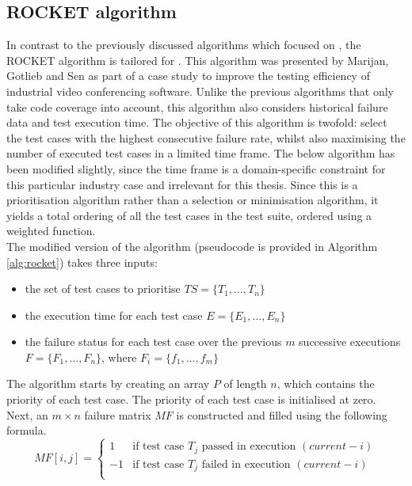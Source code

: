
\subsection{ROCKET algorithm}
\label{ssec:alg-rocket}
In contrast to the previously discussed algorithms which focused on \tsm{}, the ROCKET algorithm is tailored for \tcp{}. This algorithm was presented by Marijan, Gotlieb and Sen \cite{6676952} as part of a case study to improve the testing efficiency of industrial video conferencing software. Unlike the previous algorithms that only take code coverage into account, this algorithm also considers historical failure data and test execution time. The objective of this algorithm is twofold: select the test cases with the highest consecutive failure rate, whilst also maximising the number of executed test cases in a limited time frame. The below algorithm has been modified slightly, since the time frame is a domain-specific constraint for this particular industry case and irrelevant for this thesis. Since this is a prioritisation algorithm rather than a selection or minimisation algorithm, it yields a total ordering of all the test cases in the test suite, ordered using a weighted function.\\

\noindent The modified version of the algorithm (pseudocode is provided in Algorithm \autoref{alg:rocket}) takes three inputs:
\begin{itemize}
	\item the set of test cases to prioritise $TS = \{T_1, \dots, T_n\}$
	\item the execution time for each test case $E = \{E_1, \dots, E_n\}$
	\item the failure status for each test case over the previous $m$ successive executions $F = \{F_1, \dots, F_n\}$, where $F_i = \{f_1, \dots, f_m\}$
\end{itemize}

\noindent The algorithm starts by creating an array $P$ of length $n$, which contains the priority of each test case. The priority of each test case is initialised at zero. Next, an $m \times n$ failure matrix $MF$ is constructed and filled using the following formula.
\[
MF[i, j] = \left\{
\begin{array}{rl}
	1 & \text{if test case } T_j \text{ passed in execution } (current - i) \\
	-1 & \text{if test case } T_j \text{ failed in execution } (current - i) \\
	\end{array}
\right.
\]

